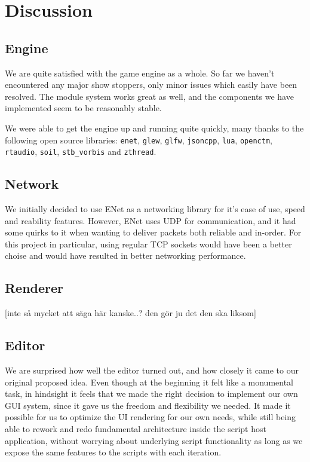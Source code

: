 \chapter{Discussion}

\section{Engine}
We are quite satisfied with the game engine as a whole. So far we haven't encountered any major show stoppers, only minor issues which easily have been resolved. The module system works great as well, and the components we have implemented seem to be reasonably stable.

We were able to get the engine up and running quite quickly, many thanks to the following open source libraries: \texttt{enet}, \texttt{glew}, \texttt{glfw}, \texttt{jsoncpp}, \texttt{lua}, \texttt{openctm}, \texttt{rtaudio}, \texttt{soil}, \texttt{stb\_vorbis} and \texttt{zthread}.

\section{Network}
We initially decided to use ENet as a networking library for it's ease of use, speed and reability features. However, ENet uses UDP for communication, and it had some quirks to it when wanting to deliver packets both reliable and in-order. For this project in particular, using regular TCP sockets would have been a better choise and would have resulted in better networking \mbox{performance}.

\section{Renderer}

[inte så mycket att säga här kanske..? den gör ju det den ska liksom]

\section{Editor}
We are surprised how well the editor turned out, and how closely it came to our original proposed idea. Even though at the beginning it felt like a monumental task, in hindsight it feels that we made the right decision to implement our own GUI system, since it gave us the freedom and flexibility we needed. It made it possible for us to optimize the UI rendering for our own needs, while still being able to rework and redo fundamental architecture inside the script host application, without worrying about underlying script functionality as long as we expose the same features to the scripts with each iteration.

